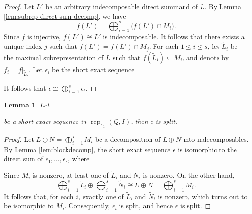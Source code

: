 \documentclass[12pt]{amsart}
\newtheorem{lemma}[theorem]{Lemma}
\theoremstyle{remark}
\theoremstyle{definition}
\numberwithin{equation}{section}
\begin{document}
\begin{proof}
Let ${L}'$ be an arbitrary indecomposable direct summand of ${L}$.  By Lemma \ref{lem:subrep-direct-sum-decomp},
we have
\[
f({L}')=\bigoplus_{i=1}^s \bigl(f({L}')\cap {M}_i\bigr).
\]
Since $f$ is injective, $f({L}')\cong {L}'$ is indecomposable. It follows that there exists a unique index $j$ such that $f({L}')=f({L}')\cap {M}_j$.
For each $1\leq i\leq s$, let $\widetilde{{L}}_i$ be the maximal subrepresentation of ${L}$ such that $f(\widetilde{{L}}_i)\subseteq {M}_i$, and denote by $f_i=f|_{\widetilde{{L}}_i}$. Let $\epsilon_i$ be the short exact sequence 
It follows that $\epsilon \cong \bigoplus_{i=1}^s \epsilon_i$.

\end{proof}

\begin{lemma}\label{lem:split}
Let
be a short exact sequence in $\operatorname{rep}_{\mathbb{F}_1}(Q,I)$,
then $\epsilon$ is split.
\end{lemma}

\begin{proof}
Let ${L}\oplus {N}=\bigoplus_{i=1}^s{M}_i$ be a decomposition of ${L}\oplus {N}$ into indecomposables. By Lemma \ref{lem:blockdecomp}, the short exact sequence $\epsilon$ is isomorphic to the direct sum of $\epsilon_1,\ldots, \epsilon_s$, where 
Since ${M}_i$ is nonzero, at least one of $\widetilde{{L}}_i$ and $\widetilde{{N}}_i$ is nonzero. On the other hand,  \[
\bigoplus_{i=1}^s\widetilde{L}_i\oplus \bigoplus_{i=1}^s\widetilde{N}_i\cong L\oplus N=\bigoplus_{i=1}^sM_i.
\]
It follows that, for each $i$, exactly one of $\widetilde{L}_i$ and $\widetilde{N}_i$ is nonzero, which turns out to be isomorphic to $M_i$.
Consequently, $\epsilon_i$ is split, and hence $\epsilon$ is split.

\end{proof}
\end{document}
